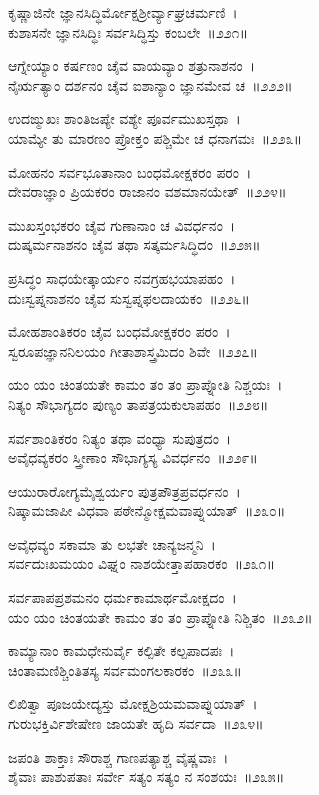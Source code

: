ಕೃಷ್ಣಾಜಿನೇ ಜ್ಞಾನಸಿದ್ಧಿರ್ಮೋಕ್ಷಶ್ರೀರ್ವ್ಯಾಘ್ರಚರ್ಮಣಿ~।\\
ಕುಶಾಸನೇ ಜ್ಞಾನಸಿದ್ಧಿಃ ಸರ್ವಸಿದ್ಧಿಸ್ತು ಕಂಬಲೇ~॥೨೨೧॥

ಆಗ್ನೇಯ್ಯಾಂ ಕರ್ಷಣಂ ಚೈವ ವಾಯವ್ಯಾಂ ಶತ್ರುನಾಶನಂ~।\\
ನೈರ್ಋತ್ಯಾಂ ದರ್ಶನಂ ಚೈವ ಐಶಾನ್ಯಾಂ ಜ್ಞಾನಮೇವ ಚ~॥೨೨೨॥

ಉದಙ್ಮುಖಃ ಶಾಂತಿಜಪ್ಯೇ ವಶ್ಯೇ ಪೂರ್ವಮುಖಸ್ತಥಾ~।\\
ಯಾಮ್ಯೇ ತು ಮಾರಣಂ ಪ್ರೋಕ್ತಂ ಪಶ್ಚಿಮೇ ಚ ಧನಾಗಮಃ~॥೨೨೩॥

ಮೋಹನಂ ಸರ್ವಭೂತಾನಾಂ ಬಂಧಮೋಕ್ಷಕರಂ ಪರಂ~।\\
ದೇವರಾಜ್ಞಾಂ ಪ್ರಿಯಕರಂ ರಾಜಾನಂ ವಶಮಾನಯೇತ್~॥೨೨೪॥

ಮುಖಸ್ತಂಭಕರಂ ಚೈವ ಗುಣಾನಾಂ ಚ ವಿವರ್ಧನಂ~।\\
ದುಷ್ಕರ್ಮನಾಶನಂ ಚೈವ ತಥಾ ಸತ್ಕರ್ಮಸಿದ್ಧಿದಂ~॥೨೨೫॥

ಪ್ರಸಿದ್ಧಂ ಸಾಧಯೇತ್ಕಾರ್ಯಂ ನವಗ್ರಹಭಯಾಪಹಂ~।\\
ದುಃಸ್ವಪ್ನನಾಶನಂ ಚೈವ ಸುಸ್ವಪ್ನಫಲದಾಯಕಂ~॥೨೨೬॥

ಮೋಹಶಾಂತಿಕರಂ ಚೈವ ಬಂಧಮೋಕ್ಷಕರಂ ಪರಂ~।\\
ಸ್ವರೂಪಜ್ಞಾನನಿಲಯಂ ಗೀತಾಶಾಸ್ತ್ರಮಿದಂ ಶಿವೇ~॥೨೨೭॥

ಯಂ ಯಂ ಚಿಂತಯತೇ ಕಾಮಂ ತಂ ತಂ ಪ್ರಾಪ್ನೋತಿ ನಿಶ್ಚಯಃ~।\\
ನಿತ್ಯಂ ಸೌಭಾಗ್ಯದಂ ಪುಣ್ಯಂ ತಾಪತ್ರಯಕುಲಾಪಹಂ~॥೨೨೮॥

ಸರ್ವಶಾಂತಿಕರಂ ನಿತ್ಯಂ ತಥಾ ವಂಧ್ಯಾ ಸುಪುತ್ರದಂ~।\\
ಅವೈಧವ್ಯಕರಂ ಸ್ತ್ರೀಣಾಂ ಸೌಭಾಗ್ಯಸ್ಯ ವಿವರ್ಧನಂ~॥೨೨೯॥

ಆಯುರಾರೋಗ್ಯಮೈಶ್ವರ್ಯಂ ಪುತ್ರಪೌತ್ರಪ್ರವರ್ಧನಂ~।\\
ನಿಷ್ಕಾಮಜಾಪೀ ವಿಧವಾ ಪಠೇನ್ಮೋಕ್ಷಮವಾಪ್ನುಯಾತ್~॥೨೩೦॥

ಅವೈಧವ್ಯಂ ಸಕಾಮಾ ತು ಲಭತೇ ಚಾನ್ಯಜನ್ಮನಿ~।\\
ಸರ್ವದುಃಖಮಯಂ ವಿಘ್ನಂ ನಾಶಯೇತ್ತಾಪಹಾರಕಂ~॥೨೩೧॥

ಸರ್ವಪಾಪಪ್ರಶಮನಂ ಧರ್ಮಕಾಮಾರ್ಥಮೋಕ್ಷದಂ~।\\
ಯಂ ಯಂ ಚಿಂತಯತೇ ಕಾಮಂ ತಂ ತಂ ಪ್ರಾಪ್ನೋತಿ ನಿಶ್ಚಿತಂ~॥೨೩೨॥

ಕಾಮ್ಯಾನಾಂ ಕಾಮಧೇನುರ್ವೈ ಕಲ್ಪಿತೇ ಕಲ್ಪಪಾದಪಃ~।\\
ಚಿಂತಾಮಣಿಶ್ಚಿಂತಿತಸ್ಯ ಸರ್ವಮಂಗಲಕಾರಕಂ~॥೨೩೩॥

ಲಿಖಿತ್ವಾ ಪೂಜಯೇದ್ಯಸ್ತು ಮೋಕ್ಷಶ್ರಿಯಮವಾಪ್ನುಯಾತ್~।\\
ಗುರುಭಕ್ತಿರ್ವಿಶೇಷೇಣ ಜಾಯತೇ ಹೃದಿ ಸರ್ವದಾ~॥೨೩೪॥

ಜಪಂತಿ ಶಾಕ್ತಾಃ ಸೌರಾಶ್ಚ ಗಾಣಪತ್ಯಾಶ್ಚ ವೈಷ್ಣವಾಃ~।\\
ಶೈವಾಃ ಪಾಶುಪತಾಃ ಸರ್ವೇ ಸತ್ಯಂ ಸತ್ಯಂ ನ ಸಂಶಯಃ~॥೨೩೫॥


